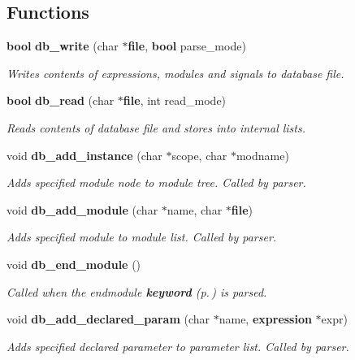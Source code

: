 \subsection*{Functions}
\begin{CompactItemize}
\item 
{\bf bool} {\bf db\_\-write} (char $\ast${\bf file}, {\bf bool} parse\_\-mode)
\begin{CompactList}\small\item\em Writes contents of expressions, modules and signals to database file.\item\end{CompactList}\item 
{\bf bool} {\bf db\_\-read} (char $\ast${\bf file}, int read\_\-mode)
\begin{CompactList}\small\item\em Reads contents of database file and stores into internal lists.\item\end{CompactList}\item 
void {\bf db\_\-add\_\-instance} (char $\ast$scope, char $\ast$modname)
\begin{CompactList}\small\item\em Adds specified module node to module tree. Called by parser.\item\end{CompactList}\item 
void {\bf db\_\-add\_\-module} (char $\ast$name, char $\ast${\bf file})
\begin{CompactList}\small\item\em Adds specified module to module list. Called by parser.\item\end{CompactList}\item 
void {\bf db\_\-end\_\-module} ()
\begin{CompactList}\small\item\em Called when the endmodule {\bf keyword} {\rm (p.\,\pageref{structkeyword})} is parsed.\item\end{CompactList}\item 
void {\bf db\_\-add\_\-declared\_\-param} (char $\ast$name, {\bf expression} $\ast$expr)
\begin{CompactList}\small\item\em Adds specified declared parameter to parameter list. Called by parser.\item\end{CompactList}\item 

\end{CompactItemize}
